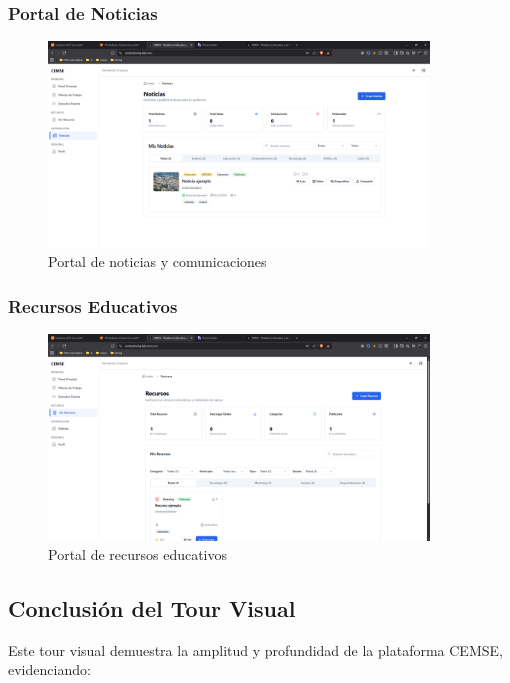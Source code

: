 \documentclass[12pt,a4paper]{article}
\begin{document}
\begin{enumerate}
\subsubsection{Portal de Noticias}
\begin{figure}[H]
    \centering
    \includegraphics[width=0.9\textwidth]{screenshots/features/news.png}
    \caption{Portal de noticias y comunicaciones}
    \label{fig:news}
\end{figure}

\subsubsection{Recursos Educativos}
\begin{figure}[H]
    \centering
    \includegraphics[width=0.9\textwidth]{screenshots/features/resources.png}
    \caption{Portal de recursos educativos}
    \label{fig:resources}
\end{figure}

\subsection{Conclusión del Tour Visual}

Este tour visual demuestra la amplitud y profundidad de la plataforma CEMSE, evidenciando:


\end{enumerate}
\end{document}

